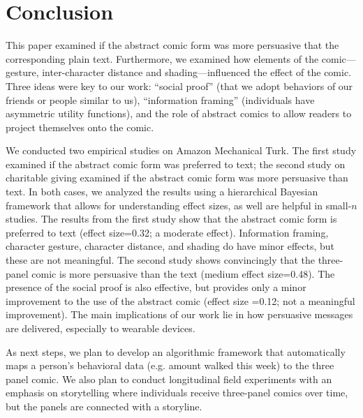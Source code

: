 \section{Conclusion}
\label{sec:Conclusion}

This paper examined if the abstract comic form was more persuasive that the corresponding plain text. Furthermore, we examined how elements of the comic---gesture, inter-character distance and shading---influenced the effect of the comic. Three ideas were key to our work: ``social proof'' (that we adopt behaviors of our friends or people similar to us), ``information framing'' (individuals have asymmetric utility functions), and the role of abstract comics to allow readers to project themselves onto the comic.

We conducted two empirical studies on Amazon Mechanical Turk. The first study examined if the abstract comic form was preferred to text; the second study on charitable giving examined if the abstract comic form was more persuasive than text. In both cases, we analyzed the results using a hierarchical Bayesian framework that allows for understanding effect sizes, as well are helpful in small-$n$ studies. The results from the first study show that the abstract comic form is preferred to text (effect size=0.32; a moderate effect). Information framing, character gesture, character distance, and shading do have minor effects, but these are not meaningful. The second study shows convincingly that the three-panel comic is more persuasive than the text (medium effect size=0.48). The presence of the social proof is also effective, but provides only a minor improvement to the use of the abstract comic (effect size =0.12; not a meaningful improvement). The main implications of our work lie in how persuasive messages are delivered, especially to wearable devices.


As next steps, we plan to develop an algorithmic framework that automatically maps a person's behavioral data (e.g. amount walked this week) to the three panel comic. We also plan to conduct longitudinal field experiments with an emphasis on storytelling where individuals receive three-panel comics over time, but the panels are connected with a storyline.
